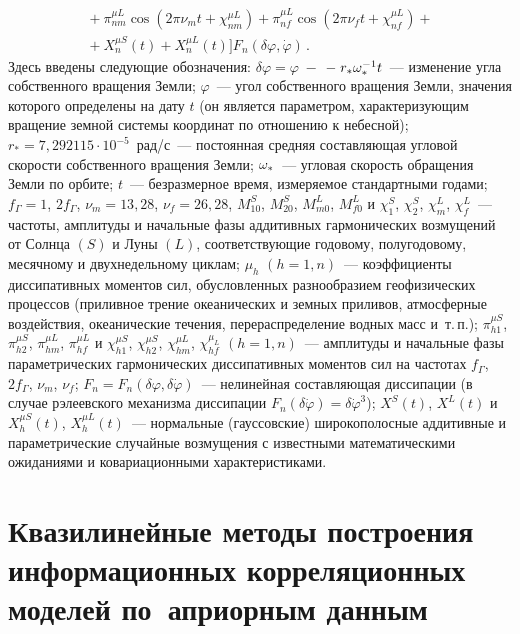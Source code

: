 \begin{multicols}{2}
\noindent
\begin{multline}
 \!\!\!\!{}+ \pi_{nm}^{\mu L} \cos \left( 2\pi \nu_m t + \chi_{nm}^{\mu L}\right)+ \pi_{nf}^{\mu L} \cos \left(2\pi \nu_f t +\chi_{nf}^{\mu L}\right)+{}\\
 {}+X_n^{\mu S} (t) + X_n^{\mu L} (t)\biggr]  F_n\left(\delta\varphi,\dot\varphi\right)\,.\label{e1}
\end{multline}
Здесь введены следующие обозначения:
$\delta\varphi =\varphi\;-$ $-\;r_* \omega_*^{-1} t$~--- изменение угла
собственного вращения Земли;
$\varphi$~--- угол собственного вращения Земли, значения которого
определены на дату $t$ (он является параметром, характеризующим
вращение земной системы координат по отношению к небесной);
$r_* = 7{,}292115 \cdot 10^{-5}$~рад/с~--- постоянная средняя составляющая
угловой скорости собственного вращения Земли;
$\omega_*$~--- угловая скорость обращения Земли по орбите;
$t$~--- безразмерное время, измеряемое стандартными годами;
$f_\Gamma = 1$, $ 2 f_\Gamma$,
$\nu_m= 13{,}28$, $\nu_f =26{,}28$, $M_{10}^S$, $M_{20}^S$, $M_{m0}^L$,
$M_{f0}^L$ и $\chi_1^S$, $\chi_2^S$, $\chi_m^L$, $\chi_f^L$~---
частоты, амплитуды и начальные фазы аддитивных гармонических возмущений
от Солнца $(S)$ и Луны $(L)$, соответствующие годовому, полугодовому,
месячному и двухнедельному циклам;
$\mu_h$ $(h=1,n)$~--- коэффициенты диссипативных моментов сил, обусловленных
разнообразием геофизических процессов (приливное трение океанических
и земных приливов, атмосферные воздействия, океанические течения,
перераспределение водных масс и~т.\,п.); $ \pi_{h1}^{\mu S}$,
$\pi_{h2}^{\mu S}$, $\pi_{hm}^{\mu L}$, $ \pi_{hf}^{\mu L}$ и
$\chi_{h1}^{\mu S}$, $\chi_{h2}^{\mu S}$, $\chi_{hm}^{\mu L}$,
$\chi_{hf}^{\mu_L}$ $(h=1,n)$~--- амплитуды и начальные фазы
параметрических гармонических диссипативных моментов сил на частотах
$f_\Gamma$, $2f_\Gamma$, $\nu_m$, $\nu_f$; $F_n=F_n \left(\delta\varphi,
\delta\dot\varphi\right)$~--- нелинейная со\-став\-ля\-ющая диссипации (в случае
рэлеевского механизма диссипации $F_n \left(\delta \dot\varphi\right)
=\delta\dot\varphi^3$); $X^S (t)$, $ X^L (t)$ и $X_h^{\mu S} (t)$,
$X_h^{\mu L} (t)$~--- нормальные (гауссовские) широкополосные
аддитивные и параметрические случайные возмущения с известными
математическими ожиданиями и ковариационными характеристиками.


\section{Квазилинейные методы построения информационных корреляционных
моделей по~априорным данным}  %


\end{multicols}
